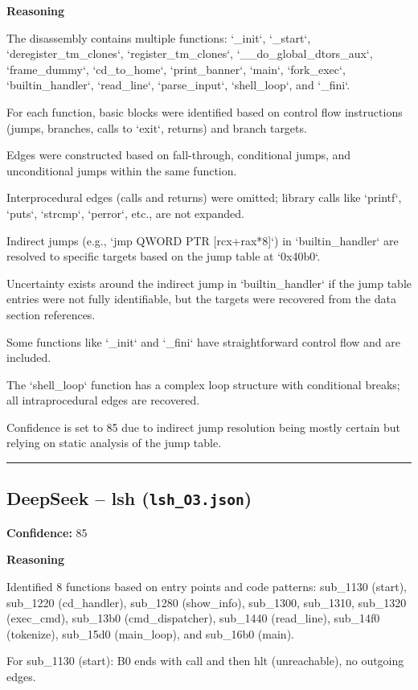 \textbf{Reasoning}

The disassembly contains multiple functions: `\_init`, `\_start`, `deregister\_tm\_clones`, `register\_tm\_clones`, `\_\_do\_global\_dtors\_aux`, `frame\_dummy`, `cd\_to\_home`, `print\_banner`, `main`, `fork\_exec`, `builtin\_handler`, `read\_line`, `parse\_input`, `shell\_loop`, and `\_fini`.

For each function, basic blocks were identified based on control flow instructions (jumps, branches, calls to `exit`, returns) and branch targets.

Edges were constructed based on fall-through, conditional jumps, and unconditional jumps within the same function.

Interprocedural edges (calls and returns) were omitted; library calls like `printf`, `puts`, `strcmp`, `perror`, etc., are not expanded.

Indirect jumps (e.g., `jmp QWORD PTR [rcx+rax*8]`) in `builtin\_handler` are resolved to specific targets based on the jump table at `0x40b0`.

Uncertainty exists around the indirect jump in `builtin\_handler` if the jump table entries were not fully identifiable, but the targets were recovered from the data section references.

Some functions like `\_init` and `\_fini` have straightforward control flow and are included.

The `shell\_loop` function has a complex loop structure with conditional breaks; all intraprocedural edges are recovered.

Confidence is set to 85 due to indirect jump resolution being mostly certain but relying on static analysis of the jump table.

\bigskip
\hrule
\bigskip

\subsection{DeepSeek -- lsh (\texttt{lsh\_O3.json})}

\textbf{Confidence:} 85

\textbf{Reasoning}

Identified 8 functions based on entry points and code patterns: sub\_1130 (start), sub\_1220 (cd\_handler), sub\_1280 (show\_info), sub\_1300, sub\_1310, sub\_1320 (exec\_cmd), sub\_13b0 (cmd\_dispatcher), sub\_1440 (read\_line), sub\_14f0 (tokenize), sub\_15d0 (main\_loop), and sub\_16b0 (main).

For sub\_1130 (start): B0 ends with call and then hlt (unreachable), no outgoing edges.

